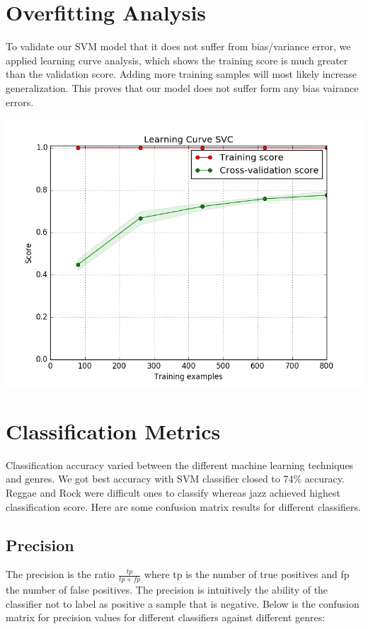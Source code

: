 \documentclass[conference]{IEEEtran}
\begin{document}
\section{Overfitting Analysis}
To validate our SVM model that it does not suffer from bias/variance error, we applied learning curve analysis, which shows the training score is much greater than the validation score. Adding more training samples will most likely increase generalization. This proves that our model does not suffer form any bias vairance errors.

\includegraphics[width=\columnwidth]{learning}
\section{Classification Metrics}
Classification accuracy varied between the different machine learning techniques and genres. We got best accuracy with SVM classifier closed to 74\% accuracy. Reggae and Rock were difficult ones to classify whereas jazz achieved highest classification score. Here are some confusion matrix results for different classifiers.
\subsection{Precision}
The precision is the ratio $\frac{tp}{tp + fp}$ where tp is the number of true positives and fp the number of false positives. The precision is intuitively the ability of the classifier not to label as positive a sample that is negative.
Below is the confusion matrix for precision values for different classifiers against different genres:
\end{document}
